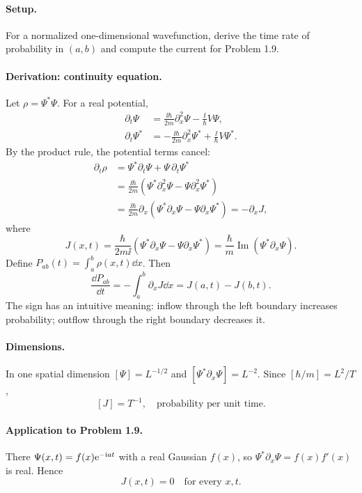 \paragraph{Setup.} For a normalized one-dimensional wavefunction, derive the time rate of probability in $(a,b)$ and compute the current for Problem 1.9.
\paragraph{Derivation: continuity equation.}
Let $\rho=\Psi^*\Psi$. For a real potential,
\begin{align}
\partial_t\Psi&=\frac{\ii\hbar}{2m}\partial_x^2\Psi
-\frac{\ii}{\hbar}V\Psi,\\
\partial_t\Psi^*&=-\frac{\ii\hbar}{2m}\partial_x^2\Psi^*
+\frac{\ii}{\hbar}V\Psi^*.
\end{align}
By the product rule, the potential terms cancel:
\begin{align}
\partial_t\rho
&=\Psi^*\partial_t\Psi+\Psi\,\partial_t\Psi^*\\
&=\frac{\ii\hbar}{2m}\left(
\Psi^*\partial_x^2\Psi-\Psi\partial_x^2\Psi^*\right)\\
&=\frac{\ii\hbar}{2m}\partial_x\left(
\Psi^*\partial_x\Psi-\Psi\partial_x\Psi^*\right)
=-\partial_xJ,
\end{align}
where
\begin{equation}
\boxed{J(x,t)=\frac{\hbar}{2m\ii}
\left(\Psi^*\partial_x\Psi-\Psi\partial_x\Psi^*\right)
=\frac{\hbar}{m}\operatorname{Im}(\Psi^*\partial_x\Psi).}
\end{equation}
Define $P_{ab}(t)=\int_a^b\rho(x,t)\dd x$. Then
\begin{equation}
\boxed{\frac{\dd P_{ab}}{\dd t}
=-\int_a^b\partial_xJ\dd x=J(a,t)-J(b,t).}
\end{equation}
The sign has an intuitive meaning: inflow through the left boundary increases probability; outflow through the right boundary decreases it.
\paragraph{Dimensions.}
In one spatial dimension $[\Psi]=L^{-1/2}$ and
$[\Psi^*\partial_x\Psi]=L^{-2}$. Since $[\hbar/m]=L^2/T$,
\begin{equation}
\boxed{[J]=T^{-1},\quad \text{probability per unit time}.}
\end{equation}
\paragraph{Application to Problem 1.9.}
There $\Psi(x,t)=f(x)\mathrm{e}^{-\mathrm{i} at}$ with a real Gaussian $f(x)$, so
$\Psi^*\partial_x\Psi=f(x)f'(x)$ is real. Hence
\begin{equation}
\boxed{J(x,t)=0\quad\text{for every }x,t.}
\end{equation}

